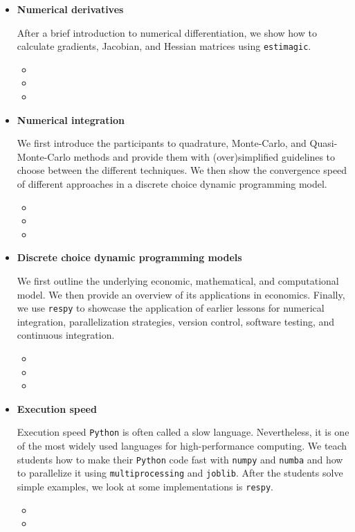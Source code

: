 \begin{itemize}
\item \textbf{Numerical derivatives}

After a brief introduction to numerical differentiation, we show how to calculate gradients, Jacobian, and Hessian matrices using \verb+estimagic+.

\begin{itemize}
  \item {}
  \item {}
  \item {}
\end{itemize}

\item \textbf{Numerical integration}

We first introduce the participants to quadrature, Monte-Carlo, and Quasi-Monte-Carlo methods and provide them with (over)simplified guidelines to choose between the different techniques. We then show the convergence speed of different approaches in a discrete choice dynamic programming model.

\begin{itemize}
  \item {}
  \item {}
  \item {}
\end{itemize}

\item \textbf{Discrete choice dynamic programming models}

We first outline the underlying economic, mathematical, and computational model. We then provide an overview of its applications in economics. Finally, we use \verb+respy+ to showcase the application of earlier lessons for numerical integration, parallelization strategies, version control, software testing, and continuous integration.

\begin{itemize}
\item {}
\item {}
\item {}
\end{itemize}

\item \textbf{Execution speed}

Execution speed \verb+Python+ is often called a slow language. Nevertheless, it is one of the most widely used languages for high-performance computing. We teach students how to make their \verb+Python+ code fast with \verb+numpy+ and \verb+numba+ and how to parallelize it using \verb+multiprocessing+ and \verb+joblib+. After the students solve simple examples, we look at some implementations is \verb+respy+.

\begin{itemize}
\item {}
\item {}
\end{itemize}

\end{itemize}




